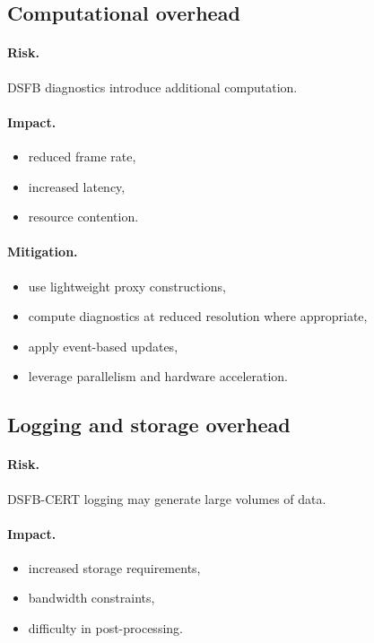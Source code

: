 \documentclass[11pt]{article}
\theoremstyle{definition}
\theoremstyle{plain}
\begin{document}

\subsection{Computational overhead}

\paragraph{Risk.}
DSFB diagnostics introduce additional computation.

\paragraph{Impact.}
\begin{itemize}[leftmargin=1.5em]
    \item reduced frame rate,
    \item increased latency,
    \item resource contention.
\end{itemize}

\paragraph{Mitigation.}
\begin{itemize}[leftmargin=1.5em]
    \item use lightweight proxy constructions,
    \item compute diagnostics at reduced resolution where appropriate,
    \item apply event-based updates,
    \item leverage parallelism and hardware acceleration.
\end{itemize}


\subsection{Logging and storage overhead}

\paragraph{Risk.}
DSFB-CERT logging may generate large volumes of data.

\paragraph{Impact.}
\begin{itemize}[leftmargin=1.5em]
    \item increased storage requirements,
    \item bandwidth constraints,
    \item difficulty in post-processing.
\end{itemize}
\end{document}
